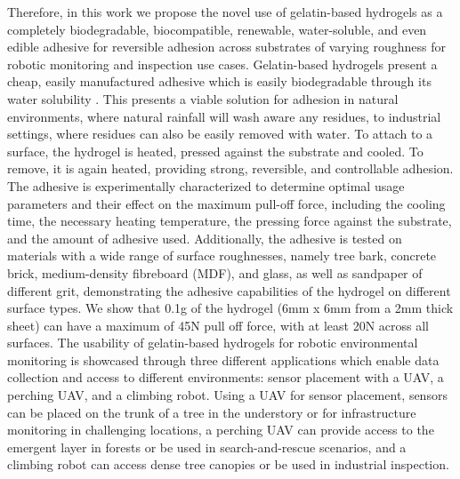 
Therefore, in this work we propose the novel use of gelatin-based hydrogels as a completely biodegradable, biocompatible, renewable, water-soluble, and even edible adhesive for reversible adhesion across substrates of varying roughness for robotic monitoring and inspection use cases. 
Gelatin-based hydrogels present a cheap, easily manufactured adhesive which is easily biodegradable through its water solubility \cite{Hartmann2021}. This presents a viable solution for adhesion in natural environments, where natural rainfall will wash aware any residues, to industrial settings, where residues can also be easily removed with water. To attach to a surface, the hydrogel is heated, pressed against the substrate and cooled. To remove, it is again heated, providing strong, reversible, and controllable adhesion. The adhesive is experimentally characterized to determine optimal usage parameters and their effect on the maximum pull-off force, including the cooling time, the necessary heating temperature, the pressing force against the substrate, and the amount of adhesive used. Additionally, the adhesive is tested on materials with a wide range of surface roughnesses, namely tree bark, concrete brick, medium-density fibreboard (MDF), and glass, as well as sandpaper of different grit, demonstrating the adhesive capabilities of the hydrogel on different surface types. We show that 0.1g of the hydrogel (6mm x 6mm from a 2mm thick sheet) can have a maximum of 45N pull off force, with at least 20N across all surfaces.
The usability of gelatin-based hydrogels for robotic environmental monitoring is showcased through three different applications which enable data collection and access to different environments: sensor placement with a UAV, a perching UAV, and a climbing robot. Using a UAV for sensor placement, sensors can be placed on the trunk of a tree in the understory or for infrastructure monitoring in challenging locations, a perching UAV can provide access to the emergent layer in forests or be used in search-and-rescue scenarios, and a climbing robot can access dense tree canopies or be used in industrial inspection.
